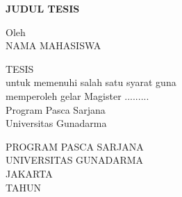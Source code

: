 \newpage
\begin{center}
\bfseries
 { \large JUDUL TESIS}
\vspace{3cm}

Oleh \\
NAMA MAHASISWA\\ %

\vspace{2cm}

TESIS\\
untuk memenuhi salah satu syarat guna \\
memperoleh gelar Magister ......... \\
Program Pasca Sarjana \\
Universitas Gunadarma\\

\vspace{3cm}

{\large
    PROGRAM PASCA SARJANA \\
    UNIVERSITAS GUNADARMA\\
    JAKARTA\\
    TAHUN %
}
\end{center}

